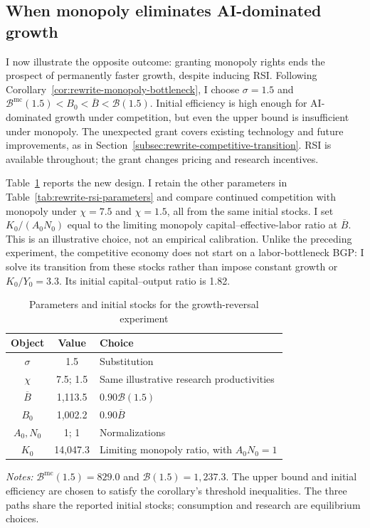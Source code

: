 \subsection{When monopoly eliminates AI-dominated growth}
\label{subsec:rewrite-monopoly-growth-reversal}

I now illustrate the opposite outcome: granting monopoly rights ends
the prospect of permanently faster growth, despite inducing RSI.
Following Corollary~\ref{cor:rewrite-monopoly-bottleneck}, I choose
$\sigma=1.5$ and
$\mathcal B^{\mathrm{mc}}(1.5)<B_0<\overline B<\mathcal B(1.5)$.
Initial efficiency is high enough for AI-dominated growth under
competition, but even the upper bound is insufficient under monopoly.
The unexpected grant covers existing technology and future improvements,
as in Section~\ref{subsec:rewrite-competitive-transition}. RSI is
available throughout; the grant changes pricing and research incentives.

Table~\ref{tab:rewrite-monopoly-growth-reversal} reports the new design.
I retain the other parameters in Table~\ref{tab:rewrite-rsi-parameters}
and compare continued competition with monopoly under $\chi=7.5$ and
$\chi=1.5$, all from the same initial stocks. I set $K_0/(A_0N_0)$
equal to the limiting monopoly capital--effective-labor ratio at
$\overline B$. This is an illustrative choice, not an empirical
calibration. Unlike the preceding experiment, the competitive economy
does not start on a labor-bottleneck BGP: I solve its transition from
these stocks rather than impose constant growth or $K_0/Y_0=3.3$.
Its initial capital--output ratio is 1.82.

\begin{table}[H]
 \centering
 \caption{Parameters and initial stocks for the growth-reversal experiment}
 \label{tab:rewrite-monopoly-growth-reversal}
 \small{}
 \begin{tabular}{ccl}
 \toprule
 Object & Value & Choice\\
 \midrule
 $\sigma$ & 1.5 & Substitution\\
 $\chi$ & 7.5; 1.5 & Same illustrative research productivities\\
 $\overline B$ & 1,113.5 & $0.90\mathcal B(1.5)$\\
 $B_0$ & 1,002.2 & $0.90\overline B$\\
 $A_0,N_0$ & 1; 1 & Normalizations\\
 $K_0$ & 14,047.3 & Limiting monopoly ratio, with $A_0N_0=1$\\
 \bottomrule
 \end{tabular}
 \par\vspace{4pt}
 \parbox{0.95\textwidth}{\footnotesize\emph{Notes:}
 $\mathcal B^{\mathrm{mc}}(1.5)=829.0$ and
 $\mathcal B(1.5)=1,237.3$. The upper bound and initial efficiency
 are chosen to satisfy the corollary's threshold inequalities.
 The three paths share the reported initial stocks; consumption
 and research are equilibrium choices.}
\end{table}

